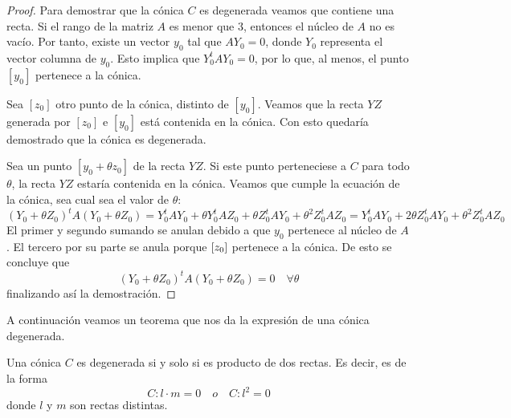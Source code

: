 \begin{proof}
	Para demostrar que la cónica $C$ es degenerada veamos que contiene una recta. Si el rango de la matriz $A$ es menor que $3$, entonces el núcleo de $A$ no es vacío. Por tanto, existe un vector $y_0$ tal que $AY_0=0$, donde $Y_0$ representa el vector columna de $y_0$. Esto implica que $Y_0^tAY_0=0$, por lo que, al menos, el punto $[y_0]$ pertenece a la cónica.
	
	Sea $[z_0]$ otro punto de la cónica, distinto de $[y_0]$. Veamos que la recta $YZ$ generada por $[z_0]$ e $[y_0]$ está contenida en la cónica. Con esto quedaría demostrado que la cónica es degenerada.
	
	Sea un punto $[y_0+\theta z_0]$ de la recta $YZ$. Si este punto perteneciese a $C$ para todo $\theta$, la recta $YZ$ estaría contenida en la cónica. Veamos que cumple la ecuación de la cónica, sea cual sea el valor de $\theta$:
	\begin{equation}\label{C8_eq_joanch_conicas_deg}
	(Y_0+\theta Z_0)^tA(Y_0+\theta Z_0)=Y_0^tAY_0+\theta Y_0^tAZ_0+\theta Z_0^tAY_0+\theta^2Z_0^tAZ_0=Y_0^tAY_0+2\theta Z_0^tAY_0+\theta^2Z_0^tAZ_0
	\end{equation}
	El primer y segundo sumando se anulan debido a que $y_0$ pertenece al núcleo de $A$. El tercero por su parte se anula porque $\left [ z_0 \right ]$ pertenece a la cónica. De esto se concluye que
	\begin{equation}
	(Y_0+\theta Z_0)^tA(Y_0+\theta Z_0)=0 \quad \forall\theta
	\end{equation}
	finalizando así la demostración.
\end{proof}

A continuación veamos un teorema que nos da la expresión de una cónica degenerada.

\begin{theo}\label{C8_theo_conica_degenerada_es_producto_rectas}
	Una cónica $C$ es degenerada si y solo si es producto de dos rectas. Es decir, es de la forma
	\begin{equation}
	C:l\cdot m=0 \quad o \quad C:l^2=0
	\end{equation}
	donde $l$ y $m$ son rectas distintas.
\end{theo}

